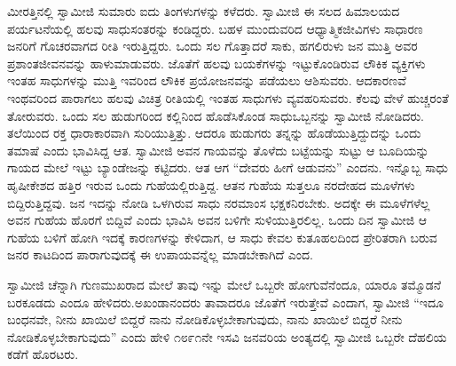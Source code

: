 ಮೀರತ್ತಿನಲ್ಲಿ ಸ್ವಾಮೀಜಿ ಸುಮಾರು ಐದು ತಿಂಗಳುಗಳನ್ನು ಕಳೆದರು. ಸ್ವಾಮೀಜಿ ಈ ಸಲದ ಹಿಮಾಲಯದ ಪರ್ಯಟನೆಯಲ್ಲಿ ಹಲವು ಸಾಧುಸಂತರನ್ನು ಕಂಡಿದ್ದರು. ಬಹಳ ಮುಂದುವರಿದ ಆಧ್ಯಾತ್ಮಿಕಜೀವಿಗಳು ಸಾಧಾರಣ ಜನರಿಗೆ ಗೊಚರವಾಗದ ರೀತಿ ಇರುತ್ತಿದ್ದರು. ಒಂದು ಸಲ ಗೊತ್ತಾದರೆ ಸಾಕು, ಹಗಲಿರುಳು ಜನ ಮುತ್ತಿ ಅವರ ಪ್ರಶಾಂತಜೀವನವನ್ನು ಹಾಳುಮಾಡುವರು. ಜೊತೆಗೆ ಹಲವು ಬಯಕೆಗಳನ್ನು ಇಟ್ಟುಕೊಂಡಿರುವ ಲೌಕಿಕ ವ್ಯಕ್ತಿಗಳು ಇಂತಹ ಸಾಧುಗಳನ್ನು ಮುತ್ತಿ ಇವರಿಂದ ಲೌಕಿಕ ಪ್ರಯೋಜನವನ್ನು ಪಡೆಯಲು ಆಶಿಸುವರು. ಆದಕಾರಣವೆ ಇಂಥವರಿಂದ ಪಾರಾಗಲು ಹಲವು ವಿಚಿತ್ರ ರೀತಿಯಲ್ಲಿ ಇಂತಹ ಸಾಧುಗಳು ವ್ಯವಹರಿಸುವರು. ಕೆಲವು ವೇಳೆ ಹುಚ್ಚರಂತೆ ತೋರುವರು. ಒಂದು ಸಲ ಹುಡುಗರಿಂದ ಕಲ್ಲಿನಿಂದ ಹೊಡೆಸಿಕೊಂಡ ಸಾಧು\break ಒಬ್ಬನನ್ನು ಸ್ವಾಮೀಜಿ ನೋಡಿದರು. ತಲೆಯಿಂದ ರಕ್ತ ಧಾರಾಕಾರವಾಗಿ ಸುರಿಯುತ್ತಿತ್ತು. ಆದರೂ ಹುಡುಗರು ತನ್ನನ್ನು ಹೊಡೆಯುತ್ತಿದ್ದುದನ್ನು ಒಂದು ತಮಾಷೆ ಎಂದು ಭಾವಿಸಿದ್ದ ಆತ. ಸ್ವಾಮೀಜಿ ಅವನ ಗಾಯವನ್ನು ತೊಳೆದು ಬಟ್ಟೆಯನ್ನು ಸುಟ್ಟು ಆ ಬೂದಿಯನ್ನು ಗಾಯದ ಮೇಲೆ ಇಟ್ಟು ಬ್ಯಾಂಡೇಜನ್ನು ಕಟ್ಟಿದರು. ಆತ ಆಗ “ದೇವರು ಹೀಗೆ ಆಡುವನು” ಎಂದನು. ಇನ್ನೊಬ್ಬ ಸಾಧು ಹೃಷೀಕೇಶದ ಹತ್ತಿರ ಇರುವ ಒಂದು ಗುಹೆಯಲ್ಲಿರುತ್ತಿದ್ದ. ಆತನ ಗುಹೆಯ ಸುತ್ತಲೂ ನರದೇಹದ ಮೂಳೆಗಳು ಬಿದ್ದಿರುತ್ತಿದ್ದವು. ಜನ ಇದನ್ನು ನೋಡಿ ಒಳಗಿರುವ ಸಾಧು ನರಮಾಂಸ ಭಕ್ಷಕನಿರಬೇಕು. ಅದಕ್ಕೇ ಈ ಮೂಳೆಗಳೆಲ್ಲ ಅವನ ಗುಹೆಯ ಹೊರಗೆ ಬಿದ್ದಿವೆ ಎಂದು ಭಾವಿಸಿ ಅವನ ಬಳಿಗೇ ಸುಳಿಯುತ್ತಿರಲಿಲ್ಲ. ಒಂದು ದಿನ ಸ್ವಾಮೀಜಿ ಆ ಗುಹೆಯ ಬಳಿಗೆ ಹೋಗಿ ಇದಕ್ಕೆ ಕಾರಣಗಳನ್ನು ಕೇಳಿದಾಗ, ಆ ಸಾಧು ಕೇವಲ ಕುತೂಹಲದಿಂದ ಪ್ರೇರಿತರಾಗಿ ಬರುವ ಜನರ ಕಾಟದಿಂದ ಪಾರಾಗುವುದಕ್ಕೆ ಈ ಉಪಾಯವನ್ನೆಲ್ಲ ಮಾಡಬೇಕಾಗಿದೆ ಎಂದ. 

ಸ್ವಾಮೀಜಿ ಚೆನ್ನಾಗಿ ಗುಣಮುಖರಾದ ಮೇಲೆ ತಾವು ಇನ್ನು ಮೇಲೆ ಒಬ್ಬರೇ ಹೋಗುವೆನೆಂದೂ, ಯಾರೂ ತಮ್ಮೊಡನೆ ಬರಕೂಡದು ಎಂದೂ ಹೇಳಿದರು.\break ಅಖಂಡಾನಂದರು ತಾವಾದರೂ ಜೊತೆಗೆ ಇರುತ್ತೇವೆ ಎಂದಾಗ, ಸ್ವಾಮೀಜಿ “ಇದೂ ಬಂಧನವೇ, ನೀನು ಖಾಯಿಲೆ ಬಿದ್ದರೆ ನಾನು ನೋಡಿಕೊಳ್ಳಬೇಕಾಗುವುದು, ನಾನು ಖಾಯಿಲೆ ಬಿದ್ದರೆ ನೀನು ನೋಡಿಕೊಳ್ಳಬೇಕಾಗುವುದು” ಎಂದು ಹೇಳಿ ೧೮೯೧ನೇ ಇಸವಿ ಜನವರಿಯ ಅಂತ್ಯದಲ್ಲಿ ಸ್ವಾಮೀಜಿ ಒಬ್ಬರೇ ದೆಹಲಿಯ ಕಡೆಗೆ ಹೊರಟರು. 

